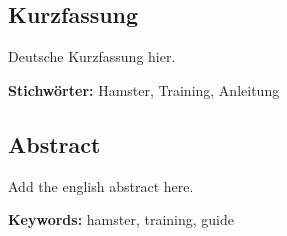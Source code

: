 \cleardoublepage

\begin{otherlanguage}{ngerman}
\chapter*{Kurzfassung}

Deutsche Kurzfassung hier.

\vfill
\noindent\textbf{Stichwörter:} Hamster, Training, Anleitung
\vfill
\end{otherlanguage}
\begin{otherlanguage}{english}
\chapter*{Abstract}

Add the english abstract here.

\vfill
\noindent\textbf{Keywords:} hamster, training, guide
\vfill
\end{otherlanguage}